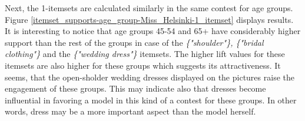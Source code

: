 
Next, the 1-itemsets are calculated similarly in the same contest for age groups. Figure \ref{itemset_supports-age_group-Miss_Helsinki-1_itemset} displays results. It is interesting to notice that age groups 45-54 and 65+ have considerably higher support than the rest of the groups in case of the \emph{\{"shoulder"\}, \{"bridal clothing"\}} and the \emph{\{"wedding dress"\}} itemsets. The higher lift values for these itemsets are also higher for these groups which suggests its attractiveness. It seems, that the open-sholder wedding dresses displayed on the pictures raise the engagement of these groups. This may indicate also that dresses become influential in favoring a model in this kind of a contest for these groups. In other words, dress may be a more important aspect than the model herself.


